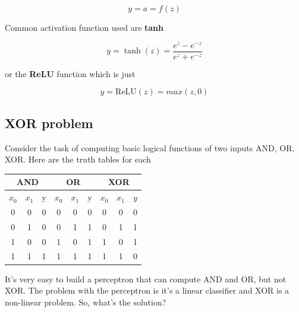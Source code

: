 \documentclass[11pt]{article}
\begin{document}
\begin{equation*}
	y = a = f(z)
\end{equation*}

Common activation function used are \textbf{tanh}

\begin{equation*}
	y = \tanh{(z)} = \frac{e^z - e^{-z}}{e^z + e^{-z}}
\end{equation*}

or the \textbf{ReLU} function which is just

\begin{equation*}
	y = \text{ReLU}(z) = max(z, 0)
\end{equation*}

\subsection{XOR problem}

Consider the task of computing basic logical functions of two inputs AND, OR, XOR. Here are the truth tables for each

\begin{center}
	\begin{tabular}{ |c|c||c|c|c||c|c|c||c| }
		\hline
		\multicolumn{3}{|c|}{AND} & \multicolumn{3}{|c|}{OR} & \multicolumn{3}{|c|}{XOR}                                           \\
		\hline
		$x_0$                     & $x_1$                    & y                         & $x_0$ & $x_1$ & y & $x_0$ & $x_1$ & $y$ \\
		\hline
		0                         & 0                        & 0                         & 0     & 0     & 0 & 0     & 0     & 0   \\
		0                         & 1                        & 0                         & 0     & 1     & 1 & 0     & 1     & 1   \\
		1                         & 0                        & 0                         & 1     & 0     & 1 & 1     & 0     & 1   \\
		1                         & 1                        & 1                         & 1     & 1     & 1 & 1     & 1     & 0   \\
		\hline
	\end{tabular}
\end{center}

It's very easy to build a perceptron that can compute AND and OR, but not XOR. The problem with the perceptron is it's a linear classifier and XOR is a non-linear problem. So, what's the solution?
\end{document}
